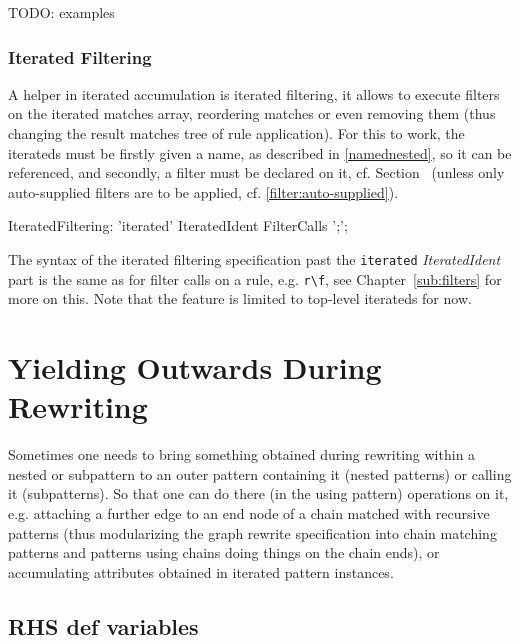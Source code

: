 TODO: examples

\subsubsection*{Iterated Filtering}\label{sub:iteratedfilter}

A helper in iterated accumulation is iterated filtering, it allows to execute filters on the iterated matches array, reordering matches or even removing them (thus changing the result matches tree of rule application).
For this to work, the iterateds must be firstly given a name, as described in \ref{namednested}, so it can be referenced, and secondly, a filter must be declared on it, cf. Section~\label{cardinality} (unless only auto-supplied filters are to be applied, cf. \ref{filter:auto-supplied}).

\begin{rail}
  IteratedFiltering: 
    'iterated' IteratedIdent FilterCalls ';';
\end{rail}

The syntax of the iterated filtering specification past the \texttt{iterated} \emph{IteratedIdent} part is the same as for filter calls on a rule, e.g. \verb#r\f#, see Chapter~\ref{sub:filters} for more on this.
Note that the feature is limited to top-level iterateds for now.



\section{Yielding Outwards During Rewriting} \label{sec:localvarorderedevalyield}

Sometimes one needs to bring something obtained during rewriting within a nested or subpattern to an outer pattern containing it (nested patterns) or calling it (subpatterns).
So that one can do there (in the using pattern) operations on it, e.g. attaching a further edge to an end node of a chain matched with recursive patterns (thus modularizing the graph rewrite specification into chain matching patterns and patterns using chains doing things on the chain ends), or accumulating attributes obtained in iterated pattern instances. 

\subsection{RHS def variables} 

